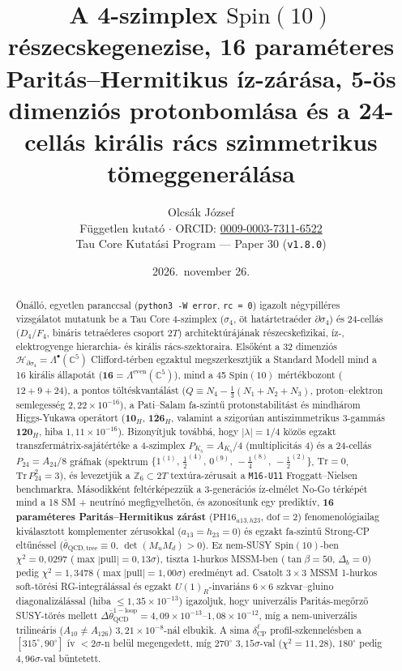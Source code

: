 \documentclass[11pt,a4paper]{article}
\title{\textbf{A 4-szimplex $\mathrm{Spin}(10)$ részecskegenezise, 16 paraméteres Paritás--Hermitikus íz-zárása, 5-ös dimenziós protonbomlása és a 24-cellás királis rács szimmetrikus tömeggenerálása}}
\author{Olcsák József\\[0.25em]
\small Független kutató $\cdot$ ORCID: \href{https://orcid.org/0009-0003-7311-6522}{0009-0003-7311-6522}\\
\small Tau Core Kutatási Program --- Paper 30 (\texttt{v1.8.0})}
\date{2026.\ november 26.}
\begin{document}
\maketitle

\begin{abstract}
Önálló, egyetlen paranccsal (\texttt{python3 -W error}, \texttt{rc = 0}) igazolt négypilléres vizsgálatot mutatunk be a Tau Core 4-szimplex ($\sigma_4$, öt határtetraéder $\partial\sigma_4$) és 24-cellás ($D_4/F_4$, bináris tetraéderes csoport $2T$) architektúrájának részecskefizikai, íz-, elektrogyenge hierarchia- és királis rács-szektoraira.
Elsőként a 32 dimenziós $\mathcal{H}_{\partial\sigma_4} = \Lambda^\bullet(\mathbb{C}^5)$ Clifford-térben egzaktul megszerkesztjük a Standard Modell mind a 16 királis állapotát ($\mathbf{16} = \Lambda^{\mathrm{even}}(\mathbb{C}^5)$), mind a 45 $\mathrm{Spin}(10)$ mértékbozont ($12+9+24$), a pontos töltéskvantálást ($Q \equiv N_4 - \frac{1}{3}(N_1+N_2+N_3)$, proton--elektron semlegesség $2{,}22\times 10^{-16}$), a Pati--Salam fa-szintű protonstabilitást és mindhárom Higgs-Yukawa operátort ($\mathbf{10}_H$, $\overline{\mathbf{126}}_H$, valamint a szigorúan antiszimmetrikus 3-gammás $\mathbf{120}_H$, hiba $1{,}11\times 10^{-16}$). Bizonyítjuk továbbá, hogy $|\lambda| = 1/4$ közös egzakt transzfermátrix-sajátértéke a 4-szimplex $P_{K_5}=A_{K_5}/4$ (multiplicitás 4) és a 24-cellás $P_{24} = A_{24}/8$ gráfnak (spektrum $\{1^{(1)},\, \tfrac{1}{2}^{(4)},\, 0^{(9)},\, -\tfrac{1}{4}^{(8)},\, -\tfrac{1}{2}^{(2)}\}$, $\mathrm{Tr}=0$, $\mathrm{Tr}\,P_{24}^2=3$), és levezetjük a $\mathbb{Z}_6 \subset 2T$ textúra-zérusait a \texttt{M16-U11} Froggatt--Nielsen benchmarkra.
Másodikként feltérképezzük a 3-generációs íz-elmélet No-Go térképét mind a 18 SM + neutrínó megfigyelhetőn, és azonosítunk egy prediktív, \textbf{16 paraméteres Paritás--Hermitikus zárást} ($\mathrm{PH16}_{a13,h23}$, $\mathrm{dof} = 2$) fenomenológiailag kiválasztott komplementer zérusokkal ($a_{13} = h_{23} = 0$) és egzakt fa-szintű Strong-CP eltűnéssel ($\bar\theta_{\mathrm{QCD,tree}} \equiv 0$, $\det(M_u M_d) > 0$). Ez nem-SUSY $\mathrm{Spin}(10)$-ben $\chi^2 = 0{,}0297$ ($\max|\mathrm{pull}| = 0{,}13\sigma$), tiszta 1-hurkos MSSM-ben ($\tan\beta = 50$, $\Delta_b = 0$) pedig $\chi^2 = 1{,}3478$ ($\max|\mathrm{pull}| = 1{,}00\sigma$) eredményt ad. Csatolt $3\times 3$ MSSM 1-hurkos soft-törési RG-integrálással és egzakt $U(1)_R$-invariáns $6\times 6$ szkvar--gluino diagonalizálással (hiba $\le 1{,}35\times 10^{-13}$) igazoljuk, hogy univerzális Paritás-megőrző SUSY-törés mellett $\Delta\bar\theta_{\mathrm{QCD}}^{\mathrm{1-loop}} = 4{,}09\times 10^{-13}\text{--}1{,}08\times 10^{-12}$, míg a nem-univerzális trilineáris ($A_{10}\neq A_{126}$) $3{,}21\times 10^{-8}$-nál elbukik. A sima $\delta_{\mathrm{CP}}^\ell$ profil-szkennelésben a $[315^\circ, 90^\circ]$ ív $<2\sigma$-n belül megengedett, míg $270^\circ$ $3{,}15\sigma$-val ($\chi^2 = 11{,}28$), $180^\circ$ pedig $4{,}96\sigma$-val büntetett.

\end{abstract}
\end{document}
